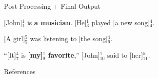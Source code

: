 \documentclass[11pt,a4paper]{beamer}
\begin{document}
\begin{frame}{Post Processing + Final Output}

[John]$^{1}_{1}$ is \textbf{a musician}. [He]$^{1}_{3}$ played [a new song]$^{4}_{4}$.

[A girl]$^{5}_{5}$ was listening to [the song]$^{4}_{6}$.

“[It]$^{4}_{7}$ is \textbf{[my]$^{1}_{9}$ favorite},” [John]$^{1}_{10}$ said to [her]$^{5}_{11}$.


\begin{quote}
\bigskip
{}
\end{quote}
\end{frame}

\begin{frame}{References}
\nocite{*}


\end{frame}
\end{document}
